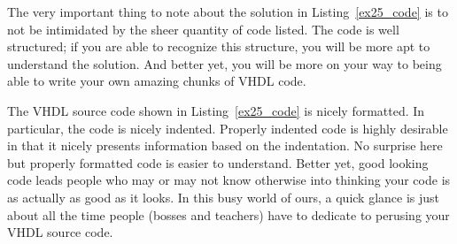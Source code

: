 \begin{my_list}
\item The very important thing to note about the solution in Listing~\ref{ex25_code} is to not be intimidated by the sheer quantity of code listed. The code is well structured; if you are able to recognize this structure, you will be more apt to understand the solution. And better yet, you will be more on your way to being able to write your own amazing chunks of VHDL code.

\item The VHDL source code shown in Listing~\ref{ex25_code} is nicely formatted. In particular, the code is nicely indented. Properly indented code is highly desirable in that it nicely presents information based on the indentation. No surprise here but properly formatted code is easier to understand. Better yet, good looking code leads people who may or may not know otherwise into thinking your code is as actually as good as it looks. In this busy world of ours, a quick glance is just about all the time people (bosses and teachers) have to dedicate to perusing your VHDL source code.
\end{my_list}

